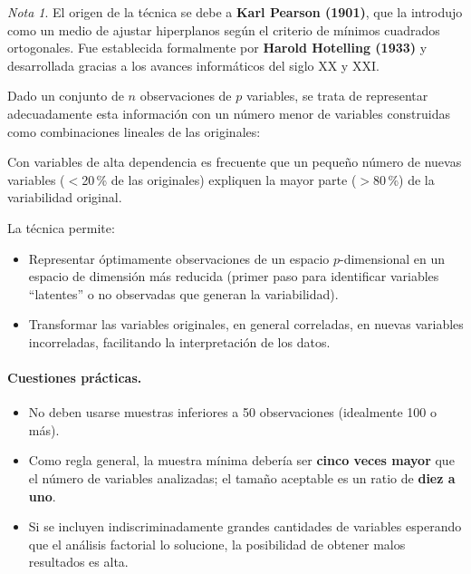 \documentclass[12pt, a4paper]{article}
\theoremstyle{plain}
\theoremstyle{definition}
\theoremstyle{remark}
\newtheorem*{nota}{Nota}
\begin{document}
\begin{nota}
El origen de la técnica se debe a \textbf{Karl Pearson (1901)}, que la
introdujo como un medio de ajustar hiperplanos según el criterio de mínimos
cuadrados ortogonales. Fue establecida formalmente por \textbf{Harold
Hotelling (1933)} y desarrollada gracias a los avances informáticos del
siglo XX y XXI.
\end{nota}

Dado un conjunto de $n$ observaciones de $p$ variables, se trata de representar
adecuadamente esta información con un número menor de variables construidas
como combinaciones lineales de las originales:

\begin{mdframed}[style=resultado]
Con variables de alta dependencia es frecuente que un pequeño número de nuevas
variables ($<$20\,\% de las originales) expliquen la mayor parte ($>$80\,\%)
de la variabilidad original.
\end{mdframed}

La técnica permite:
\begin{itemize}
  \item Representar óptimamente observaciones de un espacio $p$-dimensional
        en un espacio de dimensión más reducida (primer paso para identificar
        variables ``latentes'' o no observadas que generan la variabilidad).
  \item Transformar las variables originales, en general correladas, en nuevas
        variables incorreladas, facilitando la interpretación de los datos.
\end{itemize}

\paragraph{Cuestiones prácticas.}
\begin{itemize}
  \item No deben usarse muestras inferiores a 50 observaciones (idealmente
        100 o más).
  \item Como regla general, la muestra mínima debería ser \textbf{cinco veces
        mayor} que el número de variables analizadas; el tamaño aceptable es
        un ratio de \textbf{diez a uno}.
  \item Si se incluyen indiscriminadamente grandes cantidades de variables
        esperando que el análisis factorial lo solucione, la posibilidad de
        obtener malos resultados es alta.
\end{itemize}
\end{document}
